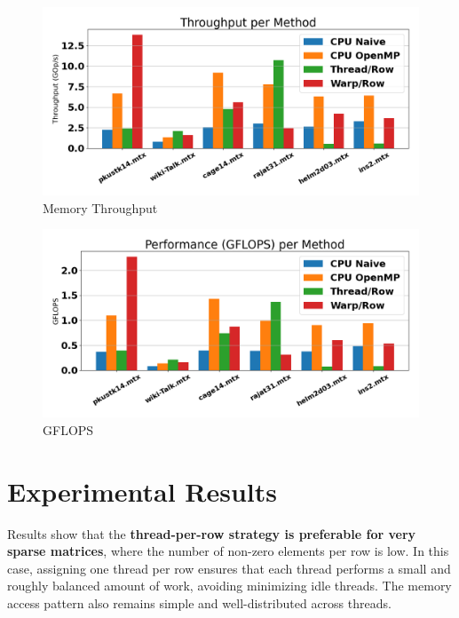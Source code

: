 \documentclass[conference]{IEEEtran}
\begin{document}
\begin{figure}
    \centering
    \includegraphics[width=1.0\linewidth]{throughput.png}
    \caption{Memory Throughput}
    \label{fig:throughputimg}
\end{figure}

\begin{figure}
    \centering
    \includegraphics[width=1.0\linewidth]{GFLOPS.png}
    \caption{GFLOPS}
    \label{fig:gflopsimg}
\end{figure}


\section{Experimental Results}
Results show that the \textbf{thread-per-row strategy is preferable for very sparse matrices}, where the number of non-zero elements per row is low. In this case, assigning one thread per row ensures that each thread performs a small and roughly balanced amount of work, avoiding minimizing idle threads. The memory access pattern also remains simple and well-distributed across threads.
\end{document}
